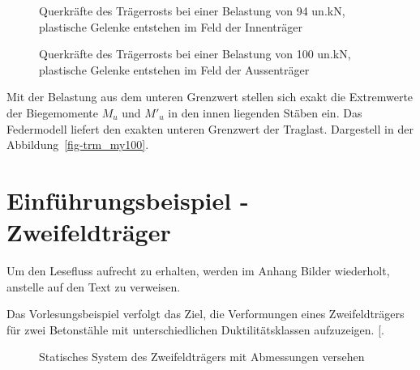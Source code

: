 \documentclass[
  11pt,
  letterpaper,
]{scrreprt}
\begin{document}
\begin{figure}[H]


\caption{\label{fig-trm_vz94}Querkräfte des Trägerrosts bei einer
Belastung von 94 un.kN, plastische Gelenke entstehen im Feld der
Innenträger}

\end{figure}%

\begin{figure}[H]


\caption{\label{fig-trm_vz100}Querkräfte des Trägerrosts bei einer
Belastung von 100 un.kN, plastische Gelenke entstehen im Feld der
Aussenträger}

\end{figure}%

Mit der Belastung aus dem unteren Grenzwert stellen sich exakt die
Extremwerte der Biegemomente \(M_u\) und \(M'_u\) in den innen liegenden
Stäben ein. Das Federmodell liefert den exakten unteren Grenzwert der
Traglast. Dargestell in der Abbildung~\ref{fig-trm_my100}.

\chapter{Einführungsbeispiel -
Zweifeldträger}\label{einfuxfchrungsbeispiel---zweifeldtruxe4ger}

Um den Lesefluss aufrecht zu erhalten, werden im Anhang Bilder
wiederholt, anstelle auf den Text zu verweisen.

Das Vorlesungsbeispiel verfolgt das Ziel, die Verformungen eines
Zweifeldträgers für zwei Betonstähle mit unterschiedlichen
Duktilitätsklassen aufzuzeigen.
{[}\citeproc{ref-jager_stahlbeton_2009}{2}{]}.

\begin{figure}[H]


\caption{\label{fig-jag_system}Statisches System des Zweifeldträgers mit
Abmessungen versehen}

\end{figure}%
\end{document}
